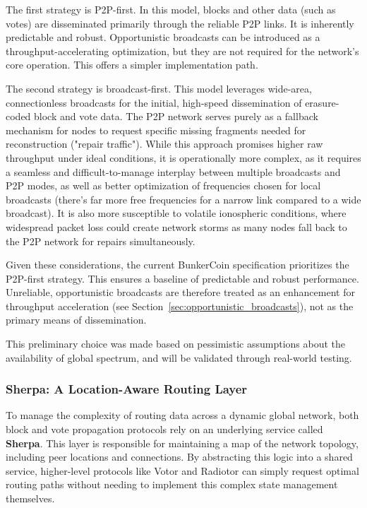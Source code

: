 \documentclass{article}
\begin{document}
The first strategy is P2P-first. In this model, blocks and other data (such as votes) are disseminated primarily through the reliable P2P links. It is inherently predictable and robust. Opportunistic broadcasts can be introduced as a throughput-accelerating optimization, but they are not required for the network's core operation. This offers a simpler implementation path.

The second strategy is broadcast-first. This model leverages wide-area, connectionless broadcasts for the initial, high-speed dissemination of erasure-coded block and vote data. The P2P network serves purely as a fallback mechanism for nodes to request specific missing fragments needed for reconstruction ("repair traffic"). While this approach promises higher raw throughput under ideal conditions, it is operationally more complex, as it requires a seamless and difficult-to-manage interplay between multiple broadcasts and P2P modes, as well as better optimization of frequencies chosen for local broadcasts (there's far more free frequencies for a narrow link compared to a wide broadcast). It is also more susceptible to volatile ionospheric conditions, where widespread packet loss could create network storms as many nodes fall back to the P2P network for repairs simultaneously.

Given these considerations, the current BunkerCoin specification prioritizes the P2P-first strategy. This ensures a baseline of predictable and robust performance. Unreliable, opportunistic broadcasts are therefore treated as an enhancement for throughput acceleration (see Section~\ref{sec:opportunistic_broadcasts}), not as the primary means of dissemination.

This preliminary choice was made based on pessimistic assumptions about the availability of global spectrum, and will be validated through real-world testing.

\subsubsection{Sherpa: A Location-Aware Routing Layer}

To manage the complexity of routing data across a dynamic global network, both block and vote propagation protocols rely on an underlying service called \textbf{Sherpa}. This layer is responsible for maintaining a map of the network topology, including peer locations and connections. By abstracting this logic into a shared service, higher-level protocols like Votor and Radiotor can simply request optimal routing paths without needing to implement this complex state management themselves.
\end{document}
